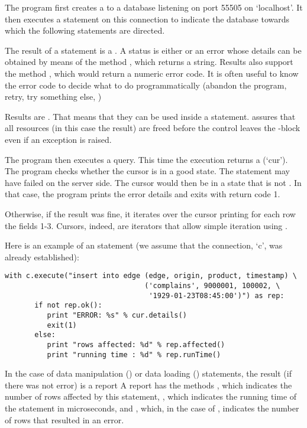 The program first creates a 
to a database listening on port 55505 on `localhost'.
It then executes a  statement on this connection
to indicate the database towards which
the following statements are directed.

The result of a  statement is a .
A status is either  or an error
whose details can be obtained by means of the method
, which returns a string.
Results also support the method ,
which would return a numeric error code.
It is often useful to know the error code to decide
what to do programmatically (abandon the program,
retry, try something else, \etc)

Results are . That means
that they can be used inside a  statement.
 assures that all resources (in this case
the result) are freed before the control leaves
the -block even if an exception is raised.

The program then executes a query.
This time the execution returns a  (`cur').
The program checks whether the cursor is
in a good state. The statement may have
failed on the server side. The cursor would
then be in a state that is not .
In that case, the program prints the error details
and exits with return code 1.

Otherwise, if the result was fine,
it iterates over the cursor
printing for each row the fields 1-3.
Cursors, indeed, are iterators
that allow simple iteration using .

\begin{minipage}{\textwidth}
Here is an example of an  statement
(we assume that the connection, `c', was already established):

\begin{python}
\begin{lstlisting}
with c.execute("insert into edge (edge, origin, product, timestamp) \
                                 ('complains', 9000001, 100002, \
                                  '1929-01-23T08:45:00')") as rep:
       if not rep.ok():
          print "ERROR: %s" % cur.details()
          exit(1)
       else:
          print "rows affected: %d" % rep.affected()
          print "running time : %d" % rep.runTime()
\end{lstlisting}
\end{python}
\end{minipage}

In the case of data manipulation ()
or data loading () statements,
the result (if there was not error) is a report
A report has the methods \term{affected()},
which indicates the number of rows affected by this statement,
\term{runTime()},
which indicates the running time of the statement in microseconds,
and ,
which, in the case of \term{load},
indicates the number of rows that resulted in an error.

